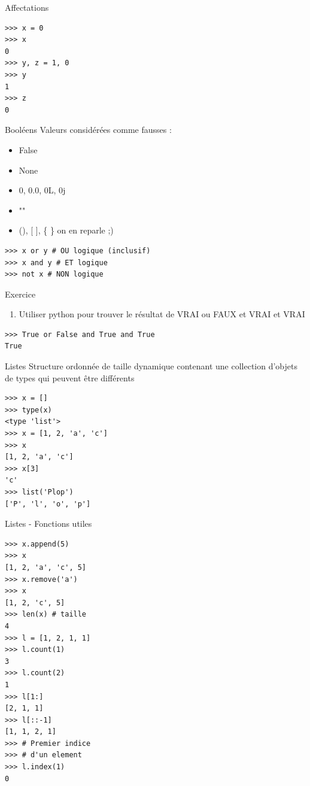\documentclass{beamer}
\begin{document}
\begin{frame}[fragile]{Affectations}
\begin{lstlisting}
>>> x = 0
>>> x
0
>>> y, z = 1, 0
>>> y
1
>>> z
0
\end{lstlisting}

\end{frame}

\begin{frame}[fragile]{Booléens}
Valeurs considérées comme fausses :
\begin{itemize}
 \item False
 \item None
 \item 0, 0.0, 0L, 0j
 \item ""
 \item (), [ ], \{ \} on en reparle ;)
\end{itemize}

\begin{lstlisting}
>>> x or y # OU logique (inclusif)
>>> x and y # ET logique
>>> not x # NON logique
\end{lstlisting}

\end{frame}

\begin{frame}[fragile]{Exercice}
\begin{enumerate}
 \item Utiliser python pour trouver le résultat de VRAI ou FAUX et VRAI et VRAI
\end{enumerate}\pause

\begin{lstlisting}
>>> True or False and True and True
True
\end{lstlisting}
\end{frame}


\begin{frame}[fragile]{Listes}
Structure ordonnée de taille dynamique contenant une collection d'objets de types qui peuvent être différents
\begin{lstlisting}
>>> x = []
>>> type(x)
<type 'list'>
>>> x = [1, 2, 'a', 'c']
>>> x
[1, 2, 'a', 'c']
>>> x[3]
'c'
>>> list('Plop')
['P', 'l', 'o', 'p']
\end{lstlisting}

\end{frame}

\begin{frame}[fragile]{Listes - Fonctions utiles}
\begin{lstlisting}[multicols=2]
>>> x.append(5)
>>> x
[1, 2, 'a', 'c', 5]
>>> x.remove('a')
>>> x
[1, 2, 'c', 5]
>>> len(x) # taille
4
>>> l = [1, 2, 1, 1]
>>> l.count(1)
3
>>> l.count(2)
1
>>> l[1:]
[2, 1, 1]
>>> l[::-1]
[1, 1, 2, 1]
>>> # Premier indice 
>>> # d'un element
>>> l.index(1)
0
\end{lstlisting}
\end{frame}
\end{document}
